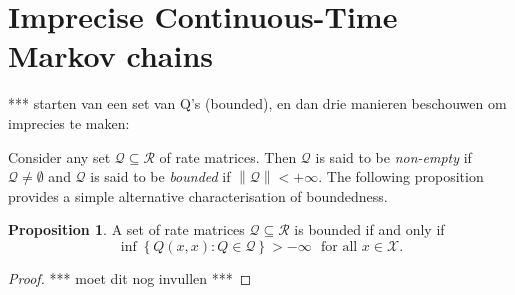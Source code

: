 \documentclass[10pt]{paper}
\theoremstyle{definition}
\newtheorem{proposition}[theorem]{Proposition}
\newtheorem{lemma}[theorem]{Lemma}
\newcommand{\states}{\mathcal{X}}
\newcommand{\rateset}{\mathcal{Q}}
\newcommand{\norm}[1]{\left\lVert #1 \right\rVert}
\begin{document}
%


\section{Imprecise Continuous-Time Markov chains}
\label{sec:iCTMC}

*** starten van een set van Q's (bounded), en dan drie manieren beschouwen om imprecies te maken:

Consider any set $\rateset\subseteq\mathcal{R}$ of rate matrices. Then $\rateset$ is said to be \emph{non-empty} if $\rateset\neq\emptyset$ and $\rateset$ is said to be \emph{bounded} if $\norm{\rateset}<+\infty$. The following proposition provides a simple alternative characterisation of boundedness.

\begin{proposition}\label{prop:alternativedefforbounded}
A set of rate matrices $\rateset\subseteq\mathcal{R}$ is bounded if and only if
\begin{equation*}
\inf\left\{Q(x,x)\colon Q\in\rateset\right\}>-\infty\text{~~for all $x\in\states$.}
\end{equation*}
\end{proposition}
\begin{proof}
*** moet dit nog invullen ***
\end{proof}
\end{document}

